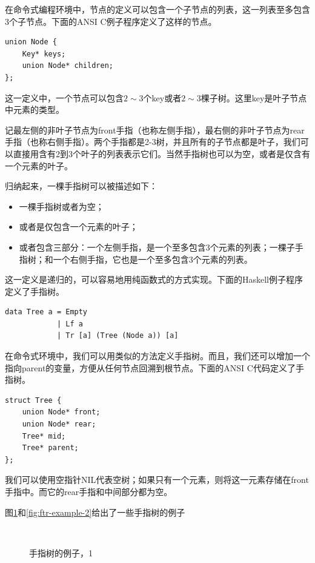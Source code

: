 \documentclass[b5paper]{ctexart}
\begin{document}
在命令式编程环境中，节点的定义可以包含一个子节点的列表，这一列表至多包含3个子节点。下面的ANSI C例子程序定义了这样的节点。

\lstset{language=C}
\begin{lstlisting}
union Node {
    Key* keys;
    union Node* children;
};
\end{lstlisting}

这一定义中，一个节点可以包含$2 \sim 3$个key或者$2 \sim 3$棵子树。这里key是叶子节点中元素的类型。

记最左侧的非叶子节点为front手指（也称左侧手指），最右侧的非叶子节点为rear手指（也称右侧手指）。两个手指都是2-3树，并且所有的子节点都是叶子，我们可以直接用含有2到3个叶子的列表表示它们。当然手指树也可以为空，或者是仅含有一个元素的叶子。

归纳起来，一棵手指树可以被描述如下：

\begin{itemize}
\item 一棵手指树或者为空；
\item 或者是仅包含一个元素的叶子；
\item 或者包含三部分：一个左侧手指，是一个至多包含3个元素的列表；一棵子手指树；和一个右侧手指，它也是一个至多包含3个元素的列表。
\end{itemize}

这一定义是递归的，可以容易地用纯函数式的方式实现。下面的Haskell例子程序定义了手指树。

\lstset{language=Haskell}
\begin{lstlisting}[style=Haskell]
data Tree a = Empty
            | Lf a
            | Tr [a] (Tree (Node a)) [a]
\end{lstlisting}

在命令式环境中，我们可以用类似的方法定义手指树。而且，我们还可以增加一个指向parent的变量，方便从任何节点回溯到根节点。下面的ANSI C代码定义了手指树。

\lstset{language=C}
\begin{lstlisting}
struct Tree {
    union Node* front;
    union Node* rear;
    Tree* mid;
    Tree* parent;
};
\end{lstlisting}

我们可以使用空指针NIL代表空树；如果只有一个元素，则将这一元素存储在front手指中。而它的rear手指和中间部分都为空。

图\ref{fig:ftr-example-1}和\ref{fig:ftr-example-2}给出了一些手指树的例子

\begin{figure}[htbp]
  \centering
   \\
  \caption{手指树的例子，1} \label{fig:ftr-example-1}
\end{figure}
\end{document}

